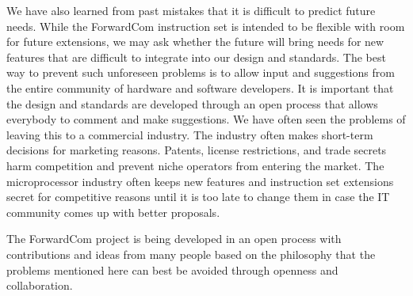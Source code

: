 \documentclass[forwardcom.tex]{subfiles}
\begin{document}
We have also learned from past mistakes that it is difficult to predict future needs. While the ForwardCom instruction set is intended to be flexible with room for future extensions, we may ask whether the future will bring needs for new features that are difficult to integrate into our design and standards. The best way to prevent such unforeseen problems is to allow input and suggestions from the entire community of hardware and software developers. It is important that the design and standards are developed through an open process that allows everybody to comment and make suggestions. We have often seen the problems of leaving this to a commercial industry. The industry often makes short-term decisions for marketing reasons. Patents, license restrictions, and trade secrets harm competition and prevent niche operators from entering the market. The microprocessor industry often keeps new features and instruction set extensions secret for competitive reasons until it is too late to change them in case the IT community comes up with better proposals.
\vv

The ForwardCom project is being developed in an open process with contributions and ideas from many people based on the philosophy that the problems mentioned here can best be avoided through openness and collaboration.
\end{document}
